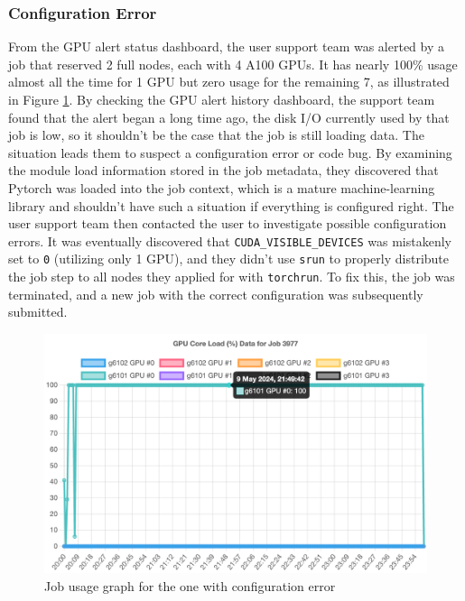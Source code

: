 \subsubsection{Configuration Error}
From the GPU alert status dashboard, the user support team was alerted by a job that reserved 2 full nodes, each with 4 A100 GPUs. It has nearly 100\% usage almost all the time for 1 GPU but zero usage for the remaining 7, as illustrated in Figure \ref{fig_job_config_error}. By checking the GPU alert history dashboard, the support team found that the alert began a long time ago, the disk I/O currently used by that job is low, so it shouldn't be the case that the job is still loading data. The situation leads them to suspect a configuration error or code bug. By examining the module load information stored in the job metadata, they discovered that Pytorch was loaded into the job context, which is a mature machine-learning library and shouldn't have such a situation if everything is configured right. The user support team then contacted the user to investigate possible configuration errors. It was eventually discovered that \texttt{CUDA\_VISIBLE\_DEVICES} was mistakenly set to \texttt{0} (utilizing only 1 GPU), and they didn't use \texttt{srun} to properly distribute the job step to all nodes they applied for with \texttt{torchrun}. To fix this, the job was terminated, and a new job with the correct configuration was subsequently submitted.

\begin{figure}[H]
    \centering
    \includegraphics[width=1\textwidth]{figures/job-config-error.png}
    \caption{Job usage graph for the one with configuration error}
    \label{fig_job_config_error}
\end{figure}

